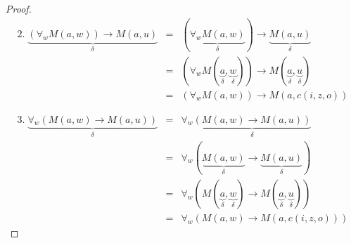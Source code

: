 \documentclass{article}
\begin{document}
\begin{proof}
  \begin{eqnarray*}
    2.\; \underbrace{(\forall_{w}M(a, w)) \rightarrow M(a, u)}_{\delta}
    &=& (\underbrace{\forall_{w}M(a, w)}_{\delta}) \rightarrow \underbrace{M(a, u)}_{\delta}\\
    &=& (\forall_{w}M(\underbrace{a}_{\delta}, \underbrace{w}_{\delta})) \rightarrow M(\underbrace{a}_{\delta}, \underbrace{u}_{\delta})\\
    &=& (\forall_{w}M(a, w)) \rightarrow M(a, c(i, z, o))
  \end{eqnarray*}
  
  \begin{eqnarray*}
    3.\; \underbrace{\forall_{w}\left(M(a,w) \rightarrow M(a,u)\right)}_{\delta}
    &=& \forall_{w}\underbrace{\left(M(a,w) \rightarrow M(a,u)\right)}_{\delta}\\
    &=& \forall_{w}(\underbrace{M(a,w)}_{\delta} \rightarrow \underbrace{M(a,u)}_{\delta})\\
    &=& \forall_{w}(M(\underbrace{a}_{\delta},\underbrace{w}_{\delta}) \rightarrow M(\underbrace{a}_{\delta},\underbrace{u}_{\delta}))\\
    &=& \forall_{w}\left(M(a,w) \rightarrow M(a,c(i,z,o))\right)
  \end{eqnarray*}
\end{proof}
\end{document}
